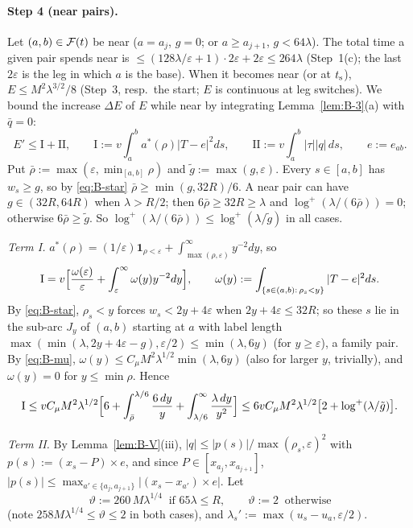 \paragraph{Step 4 (near pairs).}
Let $(a,b)\in\mathcal F(t)$ be near ($a=a_j$, $g=0$; or $a\ge a_{j+1}$, $g<64\lambda$). The total time a given pair spends near is
$\le(128\lambda/\varepsilon+1)\cdot2\varepsilon+2\varepsilon\le264\lambda$ (Step~1(c); the last $2\varepsilon$ is the leg in which $a$
is the base). When it becomes near (or at $t_{\mathrm s}$), $E\le M^2\lambda^{3/2}/8$ (Step~3, resp.\ the start; $E$ is continuous at leg
switches). We bound the increase $\Delta E$ of $E$ while near by integrating Lemma~\ref{lem:B-3}(a) with $\bar q=0$:
\[
E'\le\mathrm I+\mathrm{II},\qquad\mathrm I:=v\int_a^ba^*(\rho)|T-e|^2ds,\qquad\mathrm{II}:=v\int_a^b|\tau||q|\,ds,\qquad e:=e_{ab}.
\]
Put $\bar\rho:=\max(\varepsilon,\min_{[a,b]}\rho)$ and $\tilde g:=\max(g,\varepsilon)$. Every $s\in[a,b]$ has $w_s\ge g$, so by
\eqref{eq:B-star} $\bar\rho\ge\min(g,32R)/6$. A near pair can have $g\in(32R,64R)$ when $\lambda>R/2$; then
$6\bar\rho\ge32R\ge\lambda$ and $\log^+(\lambda/(6\bar\rho))=0$; otherwise $6\bar\rho\ge\tilde g$. So
$\log^+(\lambda/(6\bar\rho))\le\log^+(\lambda/\tilde g)$ in all cases.

\emph{Term \textup{I}.} $a^*(\rho)=(1/\varepsilon)\mathbf 1_{\rho<\varepsilon}+\int_{\max(\rho,\varepsilon)}^\infty y^{-2}dy$, so
\[
\mathrm I=v\Bigl[\frac{\omega(\varepsilon)}\varepsilon+\int_\varepsilon^\infty\omega(y)y^{-2}dy\Bigr],\qquad
\omega(y):=\int_{\{s\in(a,b):\,\rho_s<y\}}|T-e|^2ds .
\]
By \eqref{eq:B-star}, $\rho_s<y$ forces $w_s<2y+4\varepsilon$ when $2y+4\varepsilon\le32R$; so these $s$ lie in the sub-arc $J_y$ of
$(a,b)$ starting at $a$ with label length $\max(\min(\lambda,2y+4\varepsilon-g),\varepsilon/2)\le\min(\lambda,6y)$ (for
$y\ge\varepsilon$), a family pair. By \eqref{eq:B-mu}, $\omega(y)\le C_\mu M^2\lambda^{1/2}\min(\lambda,6y)$ (also for larger $y$,
trivially), and $\omega(y)=0$ for $y\le\min\rho$. Hence
\[
\mathrm I\le vC_\mu M^2\lambda^{1/2}\Bigl[6+\int_{\bar\rho}^{\lambda/6}\frac{6\,dy}y+\int_{\lambda/6}^\infty\frac{\lambda\,dy}{y^2}\Bigr]
\le6vC_\mu M^2\lambda^{1/2}\bigl[2+\log^+(\lambda/\tilde g)\bigr].
\]

\emph{Term \textup{II}.} By Lemma~\ref{lem:B-V}(iii), $|q|\le|p(s)|/\max(\rho_s,\varepsilon)^2$ with $p(s):=(x_s-P)\times e$, and
since $P\in[x_{a_j},x_{a_{j+1}}]$, $|p(s)|\le\max_{a'\in\{a_j,a_{j+1}\}}|(x_s-x_{a'})\times e|$. Let
\[
\vartheta:=260\,M\lambda^{1/4}\ \text{ if }65\lambda\le R,\qquad\vartheta:=2\ \text{ otherwise}
\]
(note $258M\lambda^{1/4}\le\vartheta\le2$ in both cases), and $\lambda_s':=\max(u_s-u_a,\varepsilon/2)$.

